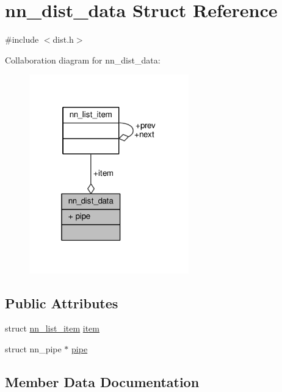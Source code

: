 \hypertarget{structnn__dist__data}{}\section{nn\+\_\+dist\+\_\+data Struct Reference}
\label{structnn__dist__data}


{\ttfamily \#include $<$dist.\+h$>$}



Collaboration diagram for nn\+\_\+dist\+\_\+data\+:\nopagebreak
\begin{figure}[H]
\begin{center}
\leavevmode
\includegraphics[width=196pt]{structnn__dist__data__coll__graph}
\end{center}
\end{figure}
\subsection*{Public Attributes}
\begin{DoxyCompactItemize}
\item 
struct \hyperlink{structnn__list__item}{nn\+\_\+list\+\_\+item} \hyperlink{structnn__dist__data_a32fb0eac783b93d2ba805656f1d9e6a6}{item}
\item 
struct nn\+\_\+pipe $\ast$ \hyperlink{structnn__dist__data_a812ff5953bd78545db17cdb09ba7cd48}{pipe}
\end{DoxyCompactItemize}


\subsection{Member Data Documentation}
